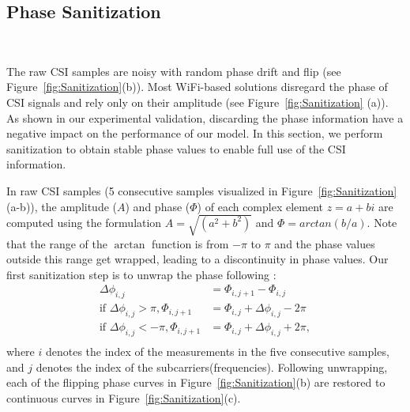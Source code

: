 \documentclass[sigconf, anonymous=false]{acmart}
\begin{document}
 \subsection{Phase Sanitization}

\begin{figure*}[!htb]
\centering
{}
 \\
\caption{Sanitization steps of CSI sequences described in Section 3.1. In each subfigure, we plot five consecutive samples (five colored curves) each containing CSI data of 30 IEEE 802.11n/ac sub-Carrier frequencies (horizontal axis).}
\label{fig:Sanitization}
\end{figure*}

The raw CSI samples are noisy with random phase drift and flip (see Figure~\ref{fig:Sanitization}(b)). Most WiFi-based solutions disregard the phase of CSI signals and rely only on their amplitude (see Figure~\ref{fig:Sanitization} (a)). As shown in our experimental validation, discarding the phase information have a negative impact on the performance of our model. In this section, we perform sanitization to obtain stable phase values to enable full use of the CSI information. 

In raw CSI samples (5 consecutive samples visualized in Figure~\ref{fig:Sanitization}(a-b)), the amplitude ($A$) and phase ($\Phi$) of each complex element $z=a+bi$ are computed using the formulation $A = \sqrt{ (a^2 + b^2)}$ and $\Phi = arctan(b/a)$. Note that the range of the $\arctan$ function is from $-\pi$ to $\pi$ and the phase values outside this range get wrapped, leading to a discontinuity in phase values. Our first sanitization step is to unwrap the phase following \cite{huawei-wifi}:
\begin{equation}
\begin{aligned}
\Delta \phi_{i,j} &= \Phi_{i,j+1} - \Phi_{i,j} \\
\text{if } \Delta \phi_{i,j} > \pi, \Phi_{i,j+1} &= \Phi_{i,j} + \Delta \phi_{i,j} - 2\pi\\
\text{if } \Delta \phi_{i,j} < -\pi, \Phi_{i,j+1} &= \Phi_{i,j} + \Delta \phi_{i,j} + 2\pi,\\
\end{aligned}
\end{equation}
where $i$ denotes the index of the measurements in the five consecutive samples, and $j$ denotes the index of the subcarriers(frequencies). Following unwrapping, each of the flipping phase curves in Figure~\ref{fig:Sanitization}(b) are restored to continuous curves in Figure~\ref{fig:Sanitization}(c). 
\end{document}
